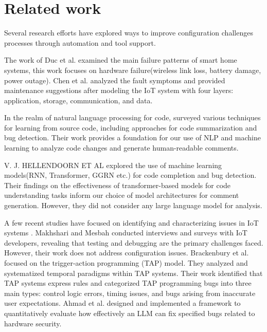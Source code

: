 \section{Related work}
Several research efforts have explored ways to improve configuration challenges processes through automation and tool support.

The work of Duc et al. \cite{10.1145/3120459.3120471} examined the main failure patterns of smart home systems, this work focuses on hardware failure(wireless link loss, battery damage, power outage). Chen et al. \cite{Chen2017ApplicationOF} analyzed the fault symptoms and provided maintenance suggestions after modeling the IoT system with four layers: application, storage, communication, and data.

In the realm of natural language processing for code, \cite{10.1145/3212695} surveyed various techniques for learning from source code, including approaches for code summarization and bug detection. Their work provides a foundation for our use of NLP and machine learning to analyze code changes and generate human-readable comments. \cite{article}

V. J. HELLENDOORN ET AL\cite{hellendoorn2020global} explored the use of machine learning models(RNN, Transformer, GGRN etc.)\cite{bani2021deep,han2021transformer,tkachenko2020approach} for code completion and bug detection. Their findings on the effectiveness of transformer-based models for code understanding tasks inform our choice of model architectures for comment generation. However, they did not consider any large language model for analysis.

A few recent studies have focused on identifying and characterizing issues in IoT systems \cite{8835392}\cite{10.1145/3290605.3300782}. Makhshari and Mesbah \cite{9402092} conducted interviews and surveys with IoT developers, revealing that testing and debugging are the primary challenges faced. However, their work does not address configuration issues. Brackenbury et al. \cite{10.1145/3290605.3300782} focused on the trigger-action programming (TAP) model. They analyzed and systematized temporal paradigms within TAP systems. Their work identified that TAP systems express rules and categorized TAP programming bugs into three main types: control logic errors, timing issues, and bugs arising from inaccurate user expectations. Ahmad et al. \cite{10462177} designed and implemented a framework to quantitatively evaluate how effectively an LLM can fix specified bugs related to hardware security.


